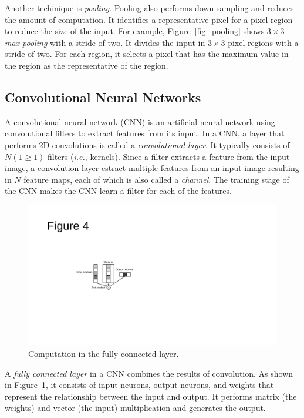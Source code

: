 Another techinique is \textit{pooling}. Pooling also performs down-sampling and reduces the amount of computation. It identifies a representative pixel for a pixel region to reduce the size of the input. For example, Figure~\ref{fig_pooling} shows $3 \times 3$ \textit{max pooling} with a stride of two. It divides the input in $3 \times 3$-pixel regions with a stride of two. For each region, it selects a pixel that has the maximum value in the region as the representative of the region. 

\subsection{Convolutional Neural Networks}
A convolutional neural network (CNN) is an artificial neural network using convolutional filters to extract features from its input. In a CNN, a layer that performs 2D convolutions is called a \textit{convolutional layer}. It typically consists of $N (1 \geq 1)$ filters (\textit{i.e.}, kernels). Since a filter extracts a feature from the input image, a convolution layer estract multiple features from an input image resulting in $N$ feature maps, each of which is also called a \textit{channel}. The training stage of the CNN makes the CNN learn a filter for each of the features.

\begin{figure}[htbp]
  \centering
  \includegraphics[width=0.5\linewidth]{./figures/fully}
  \caption{Computation in the fully connected layer. }
  \label{fig_fully}
\end{figure}

A \textit{fully connected layer} in a CNN combines the results of convolution. As shown in Figure~\ref{fig_fully}, it consists of input neurons, output neurons, and weights that represent the relationship between the input and output. It performs matrix (the weights) and vector (the input) multiplication and generates the output.

